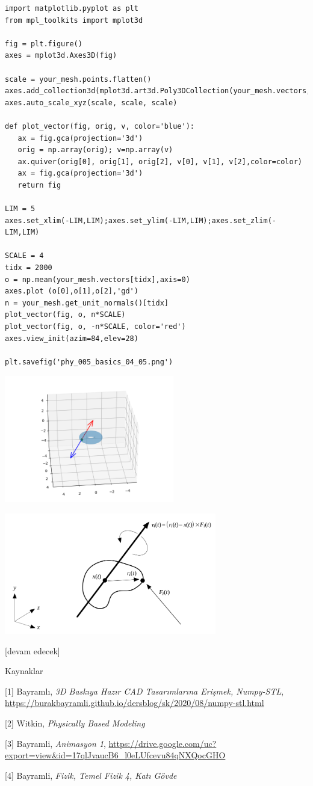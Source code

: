 \documentclass[12pt,fleqn]{article}\usepackage{../../common}
\begin{document}
\begin{verbatim}
import matplotlib.pyplot as plt
from mpl_toolkits import mplot3d

fig = plt.figure()
axes = mplot3d.Axes3D(fig)

scale = your_mesh.points.flatten()
axes.add_collection3d(mplot3d.art3d.Poly3DCollection(your_mesh.vectors,alpha=0.3))
axes.auto_scale_xyz(scale, scale, scale)

def plot_vector(fig, orig, v, color='blue'):
   ax = fig.gca(projection='3d')
   orig = np.array(orig); v=np.array(v)
   ax.quiver(orig[0], orig[1], orig[2], v[0], v[1], v[2],color=color)
   ax = fig.gca(projection='3d')  
   return fig

LIM = 5
axes.set_xlim(-LIM,LIM);axes.set_ylim(-LIM,LIM);axes.set_zlim(-LIM,LIM)

SCALE = 4
tidx = 2000
o = np.mean(your_mesh.vectors[tidx],axis=0)
axes.plot (o[0],o[1],o[2],'gd')
n = your_mesh.get_unit_normals()[tidx]
plot_vector(fig, o, n*SCALE)
plot_vector(fig, o, -n*SCALE, color='red')
axes.view_init(azim=84,elev=28)

plt.savefig('phy_005_basics_04_05.png')
\end{verbatim}

\includegraphics[width=20em]{phy_005_basics_04_05.png}

\includegraphics[width=25em]{phy_008_sim_rigbod_01.png}


[devam edecek]

Kaynaklar

[1] Bayramlı, {\em 3D Baskıya Hazır CAD Tasarımlarına Erişmek, Numpy-STL},
    \url{https://burakbayramli.github.io/dersblog/sk/2020/08/numpy-stl.html}

[2] Witkin, {\em Physically Based Modeling}

[3] Bayramli, {\em Animasyon 1},
    \url{https://drive.google.com/uc?export=view&id=17qlJvaucB6_l0eLUfcevu84qNXQocGHO}

[4] Bayramli, {\em Fizik, Temel Fizik 4, Katı Gövde}
    
\end{document}
